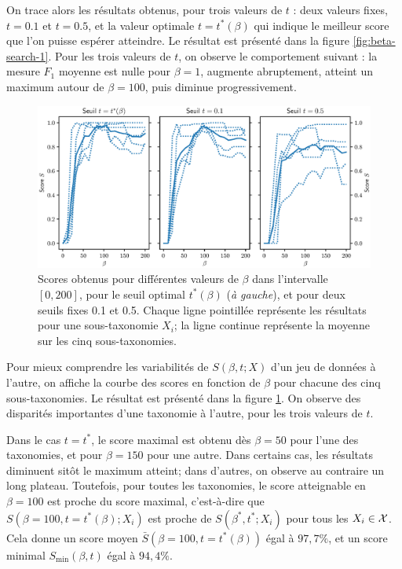 On trace alors les résultats obtenus, pour trois valeurs de $t$ : deux valeurs fixes, $t = 0.1$ et $t = 0.5$, et la valeur optimale $t = t^*(\beta)$ qui indique le meilleur score que l'on puisse espérer atteindre. Le résultat est présenté dans la figure \ref{fig:beta-search-1}. Pour les trois valeurs de $t$, on observe le comportement suivant : la mesure $F_1$ moyenne est nulle pour $\beta = 1$, augmente abruptement, atteint un maximum autour de $\beta = 100$, puis diminue progressivement. 

\begin{figure}
    \centering
    \includegraphics[width=\textwidth]{fig/plot/average_beta_breakdown_all3_FR.eps}
    \caption[Scores selon $\beta$ sur cinq sous-taxonomies]{Scores obtenus pour différentes valeurs de $\beta$ dans l'intervalle $[0, 200]$, pour le seuil optimal $t^*(\beta)$ (\textit{à gauche}), et pour deux seuils fixes 0.1 et 0.5. Chaque ligne pointillée représente les résultats pour une sous-taxonomie $X_i$; la ligne continue représente la moyenne sur les cinq sous-taxonomies.}
    \label{fig:beta-search-3}
\end{figure}

Pour mieux comprendre les variabilités de $S(\beta, t; X)$ d'un jeu de données à l'autre, on affiche la courbe des scores en fonction de $\beta$ pour chacune des cinq sous-taxonomies. Le résultat est présenté dans la figure \ref{fig:beta-search-3}. On observe des disparités importantes d'une taxonomie à l'autre, pour les trois valeurs de $t$. 

Dans le cas $t=t^*$, le score maximal est obtenu dès $\beta = 50$ pour l'une des taxonomies, et pour $\beta = 150$ pour une autre. Dans certains cas, les résultats diminuent sitôt le maximum atteint; dans d'autres, on observe au contraire un long plateau. Toutefois, pour toutes les taxonomies, le score atteignable en $\beta=100$ est proche du score maximal, c'est-à-dire que $S(\beta=100, t=t^*(\beta);X_i)$ est proche de $S(\beta^*, t^*; X_i)$ pour tous les $X_i \in \cal{X}$. Cela donne un score moyen $\bar{S}(\beta=100, t=t^*(\beta))$ égal à $97,7\%$, et un score minimal $S_{\min}(\beta, t)$ égal à $94,4\%$.

